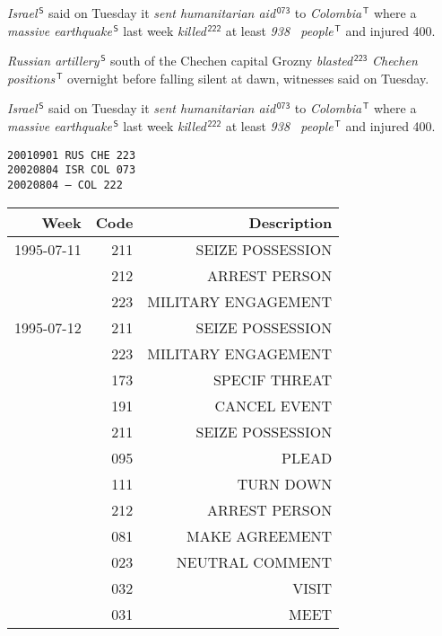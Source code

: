 \documentclass{mediumfoils}
\newcommand{\mkred}[1]{\textsl{#1}}
\newcommand{\mkgreen}[1]{\textsl{#1}}
\newcommand{\mkblue}[1]{\textsl{#1}}
\begin{document}
\noindent                                                          
\mkred{Israel}$^{\,\mathsf{S}}$ said on Tuesday it \mkgreen{sent
  humanitarian aid}$^{\,\mathsf{073}}$ to
\mkblue{Colombia}$^{\,\mathsf{T}}$ where a \mkred{massive
  earthquake}$^{\,\mathsf{S}}$ last week
\mkgreen{killed}$^{\,\mathsf{222}}$ at least \mkblue{938~
people}$^{\,\mathsf{T}}$ and injured 400.
~\\


                                                                                                                               
\mkred{Russian artillery}$^{\,\mathsf{S}}$ south of the Chechen
capital
Grozny \mkgreen{blasted}$^{\,\mathsf{223}}$ \mkblue{Chechen
positions}$^{\,\mathsf{T}}$ overnight before falling silent
at dawn, witnesses said on Tuesday.

\noindent                                                          
\mkred{Israel}$^{\,\mathsf{S}}$ said on Tuesday it \mkgreen{sent
  humanitarian aid}$^{\,\mathsf{073}}$ to
\mkblue{Colombia}$^{\,\mathsf{T}}$ where a \mkred{massive
  earthquake}$^{\,\mathsf{S}}$ last week
\mkgreen{killed}$^{\,\mathsf{222}}$ at least \mkblue{938~
people}$^{\,\mathsf{T}}$ and injured 400.
~\\
{\large
\begin{center}
\texttt{20010901 RUS CHE 223}\\
\texttt{20020804 ISR COL 073}\\
\texttt{20020804 --- COL 222}
\end{center}
}

\begin{center} 
{\footnotesize
\begin{tabular}{rrr} \toprule
Week       & Code & Description \\ \midrule
1995-07-11 & 211 & SEIZE POSSESSION \\
 & 212 & ARREST PERSON \\
 & 223 & MILITARY ENGAGEMENT \\ \midrule
1995-07-12 & 211 & SEIZE POSSESSION \\
 & 223 & MILITARY ENGAGEMENT \\
 & 173 & SPECIF THREAT \\
 & 191 & CANCEL EVENT \\
 & 211 & SEIZE POSSESSION \\
 & 095 & PLEAD \\
 & 111 & TURN DOWN \\
 & 212 & ARREST PERSON \\
 & 081 & MAKE AGREEMENT \\
 & 023 & NEUTRAL COMMENT \\
 & 032 & VISIT \\
 & 031 & MEET \\ \bottomrule
\end{tabular}
}
\end{center}
\end{document}
